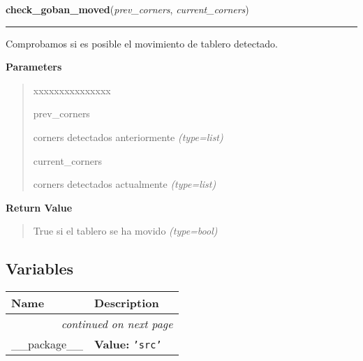 \hspace{.8\funcindent}\begin{boxedminipage}{\funcwidth}

    \raggedright \textbf{check\_goban\_moved}(\textit{prev\_corners}, \textit{current\_corners})

    \vspace{-1.5ex}

    \rule{\textwidth}{0.5\fboxrule}
\setlength{\parskip}{2ex}
Comprobamos si es posible el movimiento de tablero detectado.

\setlength{\parskip}{1ex}
      \textbf{Parameters}
      \vspace{-1ex}

      \begin{quote}
        \begin{Ventry}{xxxxxxxxxxxxxxx}

          \item[prev\_corners]


corners detectados anteriormente
            {\it (type=list)}

          \item[current\_corners]


corners detectados actualmente
            {\it (type=list)}

        \end{Ventry}

      \end{quote}

      \textbf{Return Value}
    \vspace{-1ex}

      \begin{quote}

True si el tablero se ha movido
      {\it (type=bool)}

      \end{quote}

    \end{boxedminipage}



  \subsection{Variables}

    \vspace{-1cm}
\hspace{\varindent}\begin{longtable}{|p{\varnamewidth}|p{\vardescrwidth}|l}
\cline{1-2}
\cline{1-2} \centering \textbf{Name} & \centering \textbf{Description}& \\
\cline{1-2}
\endhead\cline{1-2}\multicolumn{3}{r}{\small\textit{continued on next page}}\\\endfoot\cline{1-2}
\endlastfoot\raggedright \_\-\_\-p\-a\-c\-k\-a\-g\-e\-\_\-\_\- & \raggedright \textbf{Value:} 
{\tt \texttt{'}\texttt{src}\texttt{'}}&\\
\cline{1-2}
\end{longtable}

